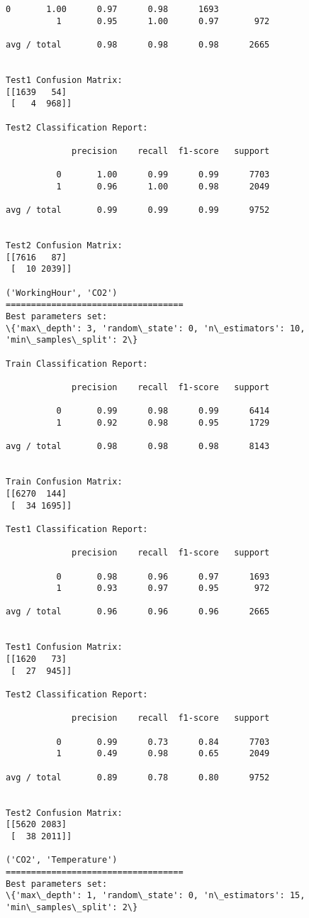 \documentclass[11pt]{article}
\begin{document}
\begin{Verbatim}[commandchars=\\\{\}]
          0       1.00      0.97      0.98      1693
          1       0.95      1.00      0.97       972

avg / total       0.98      0.98      0.98      2665


Test1 Confusion Matrix:
[[1639   54]
 [   4  968]]

Test2 Classification Report:

             precision    recall  f1-score   support

          0       1.00      0.99      0.99      7703
          1       0.96      1.00      0.98      2049

avg / total       0.99      0.99      0.99      9752


Test2 Confusion Matrix:
[[7616   87]
 [  10 2039]]

('WorkingHour', 'CO2')
===================================
Best parameters set:
\{'max\_depth': 3, 'random\_state': 0, 'n\_estimators': 10, 'min\_samples\_split': 2\}

Train Classification Report:

             precision    recall  f1-score   support

          0       0.99      0.98      0.99      6414
          1       0.92      0.98      0.95      1729

avg / total       0.98      0.98      0.98      8143


Train Confusion Matrix:
[[6270  144]
 [  34 1695]]

Test1 Classification Report:

             precision    recall  f1-score   support

          0       0.98      0.96      0.97      1693
          1       0.93      0.97      0.95       972

avg / total       0.96      0.96      0.96      2665


Test1 Confusion Matrix:
[[1620   73]
 [  27  945]]

Test2 Classification Report:

             precision    recall  f1-score   support

          0       0.99      0.73      0.84      7703
          1       0.49      0.98      0.65      2049

avg / total       0.89      0.78      0.80      9752


Test2 Confusion Matrix:
[[5620 2083]
 [  38 2011]]

('CO2', 'Temperature')
===================================
Best parameters set:
\{'max\_depth': 1, 'random\_state': 0, 'n\_estimators': 15, 'min\_samples\_split': 2\}


\end{Verbatim}
\end{document}
